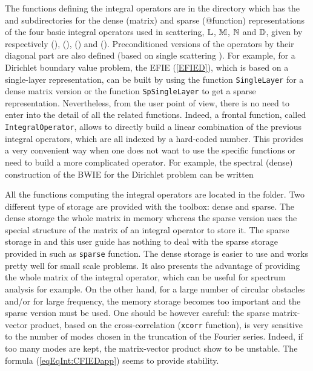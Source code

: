 The functions defining the integral operators are in the directory  which has the 
and  subdirectories for the dense (matrix) and sparse (@function) representations of the four basic integral operators used in scattering,
\ie ${\mathbb{L}}$, ${\mathbb{M}}$, ${\mathbb{N}}$ and ${\mathbb{D}}$, given by respectively (), (), () and (). Preconditioned versions of the operators by their diagonal part are also defined (based on single scattering \cite{AntChnRam08,JACT}).
For example, for a Dirichlet boundary value problem, the EFIE (\ref{EFIED}), which is based on a single-layer representation, can be built by using the function \texttt{SingleLayer} for a dense matrix version or the function \texttt{SpSingleLayer} to get a sparse representation. %
Nevertheless, from the user point of view, there is no need to enter into the detail of all the related functions. Indeed, a frontal function,
called \texttt{IntegralOperator}, allows to directly build a linear combination of the previous integral operators, which are all indexed by a hard-coded number. This provides a very convenient way
when one does not want to use the specific functions or need to build a more complicated operator. For example, the spectral (dense) construction of the BWIE for the Dirichlet problem can be written


All the functions computing the integral operators are located in the  folder.
Two different type of storage are provided with the \mudiff toolbox: dense and sparse. The dense storage the whole matrix in memory whereas the sparse version uses the special structure of the matrix of an integral operator to store it. The sparse storage in \mudiff and this user guide has nothing to deal with the sparse storage provided in \matlab such as \texttt{sparse} function. The dense storage is easier to use and works pretty well for small scale problems. It also presents the advantage of providing the whole matrix of the integral operator, which can be useful for spectrum analysis for example. On the other hand, for a large number of circular obstacles and/or for large frequency, the memory storage becomes too important and the sparse version must be used. One should be however careful: the sparse matrix-vector product, based on the cross-correlation (\texttt{xcorr} \matlab function), is very sensitive to the number of modes chosen in the truncation of the Fourier series. Indeed, if too many modes are kept, the matrix-vector product show to be unstable. The formula (\ref{eqEqInt:CFIEDapp}) seems to provide stability.

